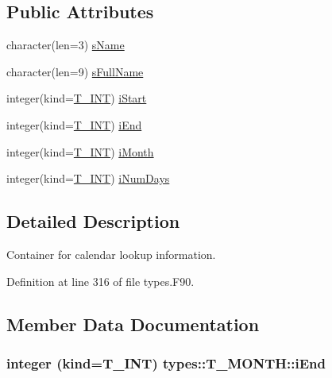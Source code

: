 \subsection*{Public Attributes}
\begin{DoxyCompactItemize}
\item 
character(len=3) \hyperlink{typetypes_1_1_t___m_o_n_t_h_ae9754c4c2c9df433af1f5659bc2aa796}{sName}
\item 
character(len=9) \hyperlink{typetypes_1_1_t___m_o_n_t_h_a3a310b2c615c0f8cd877951ff51ef450}{sFullName}
\item 
integer(kind=\hyperlink{namespacetypes_a4e4d040a4425196c4d43be63e7e6103a}{T\_\-INT}) \hyperlink{typetypes_1_1_t___m_o_n_t_h_a733335db8b7d333bb0b8f87edcffea8b}{iStart}
\item 
integer(kind=\hyperlink{namespacetypes_a4e4d040a4425196c4d43be63e7e6103a}{T\_\-INT}) \hyperlink{typetypes_1_1_t___m_o_n_t_h_a158e65df0b9c617047a6da98672c1ce6}{iEnd}
\item 
integer(kind=\hyperlink{namespacetypes_a4e4d040a4425196c4d43be63e7e6103a}{T\_\-INT}) \hyperlink{typetypes_1_1_t___m_o_n_t_h_ad94b74db48b815e971228babd4493268}{iMonth}
\item 
integer(kind=\hyperlink{namespacetypes_a4e4d040a4425196c4d43be63e7e6103a}{T\_\-INT}) \hyperlink{typetypes_1_1_t___m_o_n_t_h_a6ad9e3c56c7513a3987e7ebdf83a681b}{iNumDays}
\end{DoxyCompactItemize}


\subsection{Detailed Description}
Container for calendar lookup information. 

Definition at line 316 of file types.F90.



\subsection{Member Data Documentation}
\hypertarget{typetypes_1_1_t___m_o_n_t_h_a158e65df0b9c617047a6da98672c1ce6}{
\subsubsection[{iEnd}]{\setlength{\rightskip}{0pt plus 5cm}integer (kind={\bf T\_\-INT}) {\bf types::T\_\-MONTH::iEnd}}}
\label{typetypes_1_1_t___m_o_n_t_h_a158e65df0b9c617047a6da98672c1ce6}


